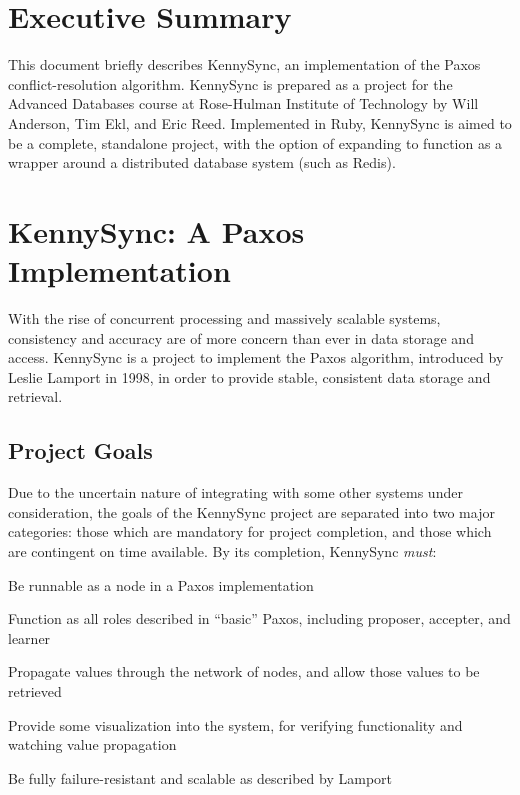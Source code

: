 \documentclass{article}
\begin{document}

\section{Executive Summary}

This document briefly describes KennySync, an implementation of the Paxos conflict-resolution algorithm. KennySync is prepared as a project for the Advanced Databases course at Rose-Hulman Institute of Technology by Will Anderson, Tim Ekl, and Eric Reed. Implemented in Ruby, KennySync is aimed to be a complete, standalone project, with the option of expanding to function as a wrapper around a distributed database system (such as Redis).

\section{KennySync: A Paxos Implementation}

With the rise of concurrent processing and massively scalable systems, consistency and accuracy are of more concern than ever in data storage and access. KennySync is a project to implement the Paxos algorithm, introduced by Leslie Lamport in 1998, in order to provide stable, consistent data storage and retrieval.

\subsection{Project Goals}

Due to the uncertain nature of integrating with some other systems under consideration, the goals of the KennySync project are separated into two major categories: those which are mandatory for project completion, and those which are contingent on time available. By its completion, KennySync \textit{must}:

\begin{itemize*}
\item Be runnable as a node in a Paxos implementation
\item Function as all roles described in ``basic'' Paxos, including proposer, accepter, and learner
\item Propagate values through the network of nodes, and allow those values to be retrieved
\item Provide some visualization into the system, for verifying functionality and watching value propagation
\item Be fully failure-resistant and scalable as described by Lamport
\end{itemize*}
\end{document}
